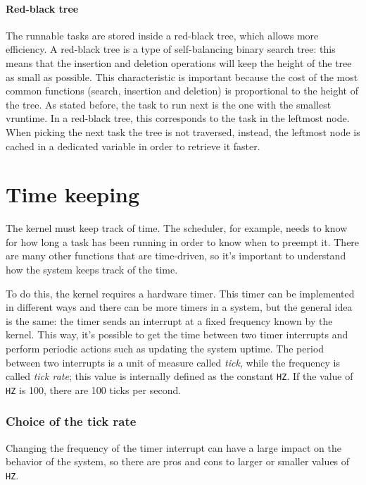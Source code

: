 \paragraph{Red-black tree}
\label{sec:rb-tree}
The runnable tasks are stored inside a red-black tree, which allows more efficiency. A red-black tree is a type of self-balancing binary search tree: this means that the insertion and deletion operations will keep the height of the tree as small as possible. This characteristic is important because the cost of the most common functions (search, insertion and deletion) is proportional to the height of the tree.
As stated before, the task to run next is the one with the smallest vruntime. In a red-black tree, this corresponds to the task in the leftmost node. When picking the next task the tree is not traversed, instead, the leftmost node is cached in a dedicated variable in order to retrieve it faster.

\section{Time keeping}
\label{sec:timekeeping}
The kernel must keep track of time. The scheduler, for example, needs to know for how long a task has been running in order to know when to preempt it. There are many other functions that are time-driven, so it's important to understand how the system keeps track of the time.

To do this, the kernel requires a hardware timer. This timer can be implemented in different ways and there can be more timers in a system, but the general idea is the same: the timer sends an interrupt at a fixed frequency known by the kernel. This way, it's possible to get the time between two timer interrupts and perform periodic actions such as updating the system uptime. The period between two interrupts is a unit of measure called \textit{tick}, while the frequency is called \textit{tick rate}; this value is internally defined as the constant \texttt{HZ}. If the value of \texttt{HZ} is 100, there are 100 ticks per second.

\subsubsection{Choice of the tick rate}
Changing the frequency of the timer interrupt can have a large impact on the behavior of the system, so there are pros and cons to larger or smaller values of \texttt{HZ}.

